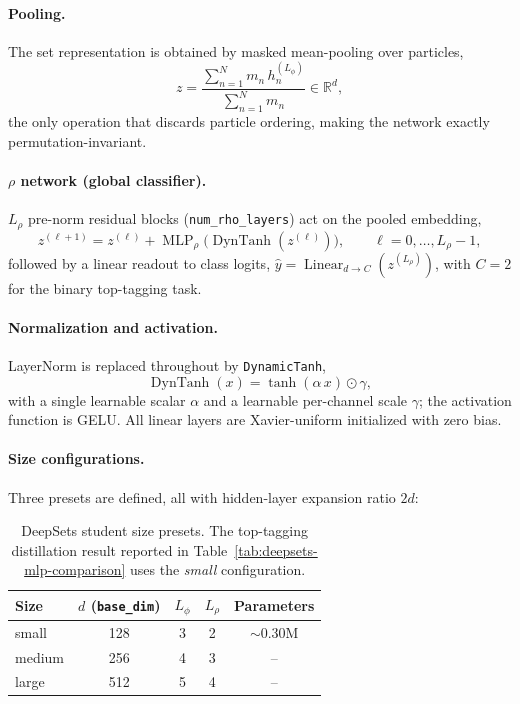 \paragraph{Pooling.}
The set representation is obtained by masked mean-pooling over particles,
\begin{equation}
    z = \frac{\sum_{n=1}^{N} m_n \, h_n^{(L_\phi)}}{\sum_{n=1}^{N} m_n} \in \mathbb{R}^{d},
\end{equation}
the only operation that discards particle ordering, making the network exactly
permutation-invariant.

\paragraph{$\rho$ network (global classifier).}
$L_\rho$ pre-norm residual blocks (\texttt{num\_rho\_layers}) act on the pooled
embedding,
\begin{equation}
    z^{(\ell+1)} = z^{(\ell)} + \operatorname{MLP}_\rho\!\big(
        \operatorname{DynTanh}(z^{(\ell)})
    \big), \qquad \ell = 0, \dots, L_\rho - 1,
\end{equation}
followed by a linear readout to class logits,
$\hat{y} = \operatorname{Linear}_{d \to C}(z^{(L_\rho)})$, with $C=2$ for the binary
top-tagging task.

\paragraph{Normalization and activation.}
LayerNorm is replaced throughout by \texttt{DynamicTanh},
\begin{equation}
    \operatorname{DynTanh}(x) = \tanh(\alpha \, x) \odot \gamma,
\end{equation}
with a single learnable scalar $\alpha$ and a learnable per-channel scale
$\gamma$; the activation function is GELU. All linear layers are Xavier-uniform
initialized with zero bias.

\paragraph{Size configurations.}
Three presets are defined, all with hidden-layer expansion ratio $2d$:

\begin{table}[h]
    \centering
    \begin{tabular}{lcccc}
        \toprule
        Size & $d$ (\texttt{base\_dim}) & $L_\phi$ & $L_\rho$ & Parameters \\
        \midrule
        small  & 128 & 3 & 2 & $\sim$0.30M \\
        medium & 256 & 4 & 3 & -- \\
        large  & 512 & 5 & 4 & -- \\
        \bottomrule
    \end{tabular}
    \caption{DeepSets student size presets. The top-tagging distillation result
    reported in Table~\ref{tab:deepsets-mlp-comparison} uses the \emph{small}
    configuration.}
    \label{tab:deepsets-sizes}
\end{table}

